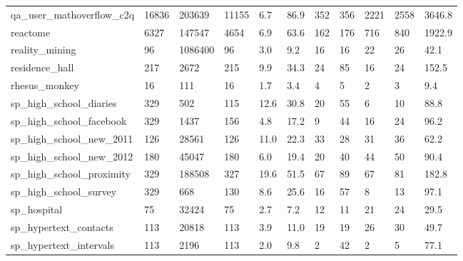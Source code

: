 \begin{longtable}{lllllllllll}
 qa\_user\_mathoverflow\_c2q                           & 16836      & 203639    & 11155 & 6.7    & 86.9   & 352   & 356    & 2221   & 2558   & 3646.8  \\
 reactome                                           & 6327       & 147547    & 4654  & 6.9    & 63.6   & 162   & 176    & 716    & 840    & 1922.9  \\
 reality\_mining                                     & 96         & 1086400   & 96    & 3.0    & 9.2    & 16    & 16     & 22     & 26     & 42.1    \\
 residence\_hall                                     & 217        & 2672      & 215   & 9.9    & 34.3   & 24    & 85     & 16     & 24     & 152.5   \\
 rhesus\_monkey                                      & 16         & 111       & 16    & 1.7    & 3.4    & 4     & 5      & 2      & 3      & 9.4     \\
 sp\_high\_school\_diaries                             & 329        & 502       & 115   & 12.6   & 30.8   & 20    & 55     & 6      & 10     & 88.8    \\
 sp\_high\_school\_facebook                            & 329        & 1437      & 156   & 4.8    & 17.2   & 9     & 44     & 16     & 24     & 96.2    \\
 sp\_high\_school\_new\_2011                            & 126        & 28561     & 126   & 11.0   & 22.3   & 33    & 28     & 31     & 36     & 62.2    \\
 sp\_high\_school\_new\_2012                            & 180        & 45047     & 180   & 6.0    & 19.4   & 20    & 40     & 44     & 50     & 90.4    \\
 sp\_high\_school\_proximity                           & 329        & 188508    & 327   & 19.6   & 51.5   & 67    & 89     & 67     & 81     & 182.8   \\
 sp\_high\_school\_survey                              & 329        & 668       & 130   & 8.6    & 25.6   & 16    & 57     & 8      & 13     & 97.1    \\
 sp\_hospital                                        & 75         & 32424     & 75    & 2.7    & 7.2    & 12    & 11     & 21     & 24     & 29.5    \\
 sp\_hypertext\_contacts                              & 113        & 20818     & 113   & 3.9    & 11.0   & 19    & 19     & 26     & 30     & 49.7    \\
 sp\_hypertext\_intervals                             & 113        & 2196      & 113   & 2.0    & 9.8    & 2     & 42     & 2      & 5      & 77.1    \\

\end{longtable}
